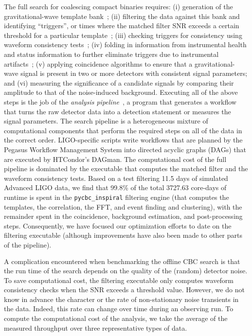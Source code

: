 The full search for coalescing compact binaries requires: (i) generation of the
gravitational-wave template bank~\cite{Babak:2006ty,Brown:2012qf}; (ii) filtering
the data against this bank and identifying ``triggers'', or times where the
matched filter \ac{SNR} exceeds a certain threshold for a
particular template~\cite{Allen:2005fk}; (iii) checking triggers for consistency
using waveform consistency tests~\cite{Allen:2004gu}; (iv) folding in
information from instrumental health and status information to further
eliminate triggers due to instrumental
artifacts~\cite{Slutsky:2010ff,Aasi:2012wd-2}; (v) applying coincidence algorithms
to ensure that a gravitational-wave signal is present in two or more detectors
with consistent signal parameters; and (vi) measuring the significance of a
candidate signals by comparing their amplitude to that of the noise-induced
background.   Executing all of the above steps is the job of the \emph{analysis
pipeline}~\cite{Babak:2012zx,Brown:workflow}, a program that generates a
workflow that turns the raw detector data into a detection statement or
measures the signal parameters. The search pipeline is a heterogeneous mixture
of computational components that perform the required steps on all of the data
in the correct order. LIGO-specific scripts write workflows that are planned
by the Pegasus Workflow Management System into directed acyclic graphs (DAGs) that are executed by
HTCondor's DAGman. 
The computational cost of the full pipeline is dominated by the executable that
computes the matched filter and the waveform consistency tests. Based on a test
filtering 11.5 days of simulated Advanced LIGO data, we find that 99.8\% of the total 3727.63 core-days of runtime is spent in the \texttt{pycbc\_inspiral} filtering engine (that computes the templates, the correlation, the FFT, and event finding and clustering), with the remainder spent in the
coincidence, background estimation, and post-processing steps. Consequently,
we have focused our optimization efforts to date on the filtering executable
(although improvements have also been made to other parts of the pipeline).

A complication encountered when
benchmarking the offline CBC search is that the run time of the search  depends on the quality
of the (random) detector noise. To save computational cost, the filtering
executable only computes waveform consistency checks when the \ac{SNR} exceeds
a threshold value. However, we do not know in advance the character or the
rate of non-stationary noise transients in the data. Indeed, this rate can
change over time during an observing run.  To compute the computational cost
of the analysis, we take the average of the measured throughput over three
representative types of data. 

